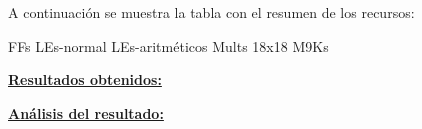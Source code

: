 \documentclass[parskip,a4paper,12pt]{article}
\newcommand{\fila}{}
\begin{document}
A continuación se muestra la tabla con el resumen de los recursos:


\def\colUNO{3cm}
\def\colDOS{5.5cm}
\def\colTRES{5.5cm}

\begin{table}[H]
\centering
    \caption{Recursos hardware}
    \label{tab:recursos_HW}
\gdef\cabecera{\fila{RECURSO}{NÚMERO OBTENIDO}}
\noindent\begin{mitabla}
\fila{FFs}{}
\fila{LEs-normal}{}  
\fila{LEs-aritméticos}{}  
\fila{Mults 18x18}{}
\fila{M9Ks}{}
\end{mitabla}
\end{table}

\underline{\textbf{Resultados obtenidos:}}

\underline{\textbf{Análisis del resultado:}}



\end{document}
